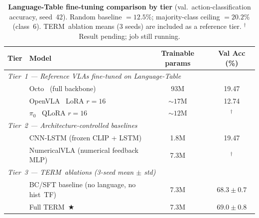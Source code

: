 \documentclass{article}
\renewcommand{\arraystretch}{1.25}
\newcommand{\modelname}{\textsc{TERM}\xspace}
\begin{document}
\begin{table}[h]
\centering
\caption{\textbf{Language-Table fine-tuning comparison by tier}
  (val.\ action-classification accuracy, seed~42).
  Random baseline $= 12.5\%$; majority-class ceiling $= 20.2\%$ (class~6).
  \modelname\ ablation means (3 seeds) are included as a reference tier.
  $^{\dagger}$Result pending; job still running.}
\label{tab:lt_finetune}
\small
\setlength{\tabcolsep}{5pt}
\renewcommand{\arraystretch}{1.15}
\begin{tabular}{llcc}
\toprule
\textbf{Tier} & \textbf{Model} & \textbf{Trainable params} & \textbf{Val Acc (\%)} \\
\midrule
\multicolumn{4}{l}{\textit{Tier~1 — Reference VLAs fine-tuned on Language-Table}} \\
& Octo~\citep{octo2024} (full backbone) & 93M & 19.47 \\
& OpenVLA~\citep{kim2024openvla} LoRA $r{=}16$ & ${\sim}17$M & 12.74 \\
& $\pi_0$~\citep{black2024pi0} QLoRA $r{=}16$ & ${\sim}12$M & $^\dagger$ \\
\midrule
\multicolumn{4}{l}{\textit{Tier~2 — Architecture-controlled baselines}} \\
& CNN-LSTM (frozen CLIP + LSTM)         & 1.8M  & 19.47 \\
& NumericalVLA (numerical feedback MLP) & 7.3M  & $^\dagger$ \\
\midrule
\multicolumn{4}{l}{\textit{Tier~3 — \modelname\ ablations (3-seed mean $\pm$ std)}} \\
& BC/SFT baseline (no language, no hist~TF) & 7.3M & $68.3 \pm 0.7$ \\
& Full \modelname\ ★                         & 7.3M & $\mathbf{69.0 \pm 0.8}$ \\
\bottomrule
\end{tabular}
\end{table}
\end{document}
